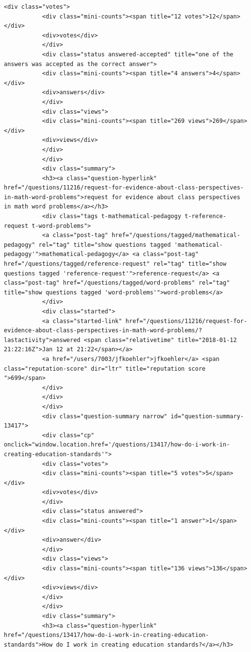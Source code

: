 \documentclass[11pt]{article}
\begin{document}
\begin{Verbatim}[commandchars=\\\{\}]
           <div class="votes">
           <div class="mini-counts"><span title="12 votes">12</span></div>
           <div>votes</div>
           </div>
           <div class="status answered-accepted" title="one of the answers was accepted as the correct answer">
           <div class="mini-counts"><span title="4 answers">4</span></div>
           <div>answers</div>
           </div>
           <div class="views">
           <div class="mini-counts"><span title="269 views">269</span></div>
           <div>views</div>
           </div>
           </div>
           <div class="summary">
           <h3><a class="question-hyperlink" href="/questions/11216/request-for-evidence-about-class-perspectives-in-math-word-problems">request for evidence about class perspectives in math word problems</a></h3>
           <div class="tags t-mathematical-pedagogy t-reference-request t-word-problems">
           <a class="post-tag" href="/questions/tagged/mathematical-pedagogy" rel="tag" title="show questions tagged 'mathematical-pedagogy'">mathematical-pedagogy</a> <a class="post-tag" href="/questions/tagged/reference-request" rel="tag" title="show questions tagged 'reference-request'">reference-request</a> <a class="post-tag" href="/questions/tagged/word-problems" rel="tag" title="show questions tagged 'word-problems'">word-problems</a>
           </div>
           <div class="started">
           <a class="started-link" href="/questions/11216/request-for-evidence-about-class-perspectives-in-math-word-problems/?lastactivity">answered <span class="relativetime" title="2018-01-12 21:22:16Z">Jan 12 at 21:22</span></a>
           <a href="/users/7003/jfkoehler">jfkoehler</a> <span class="reputation-score" dir="ltr" title="reputation score ">699</span>
           </div>
           </div>
           </div>
           <div class="question-summary narrow" id="question-summary-13417">
           <div class="cp" onclick="window.location.href='/questions/13417/how-do-i-work-in-creating-education-standards'">
           <div class="votes">
           <div class="mini-counts"><span title="5 votes">5</span></div>
           <div>votes</div>
           </div>
           <div class="status answered">
           <div class="mini-counts"><span title="1 answer">1</span></div>
           <div>answer</div>
           </div>
           <div class="views">
           <div class="mini-counts"><span title="136 views">136</span></div>
           <div>views</div>
           </div>
           </div>
           <div class="summary">
           <h3><a class="question-hyperlink" href="/questions/13417/how-do-i-work-in-creating-education-standards">How do I work in creating education standards?</a></h3>

\end{Verbatim}
\end{document}
